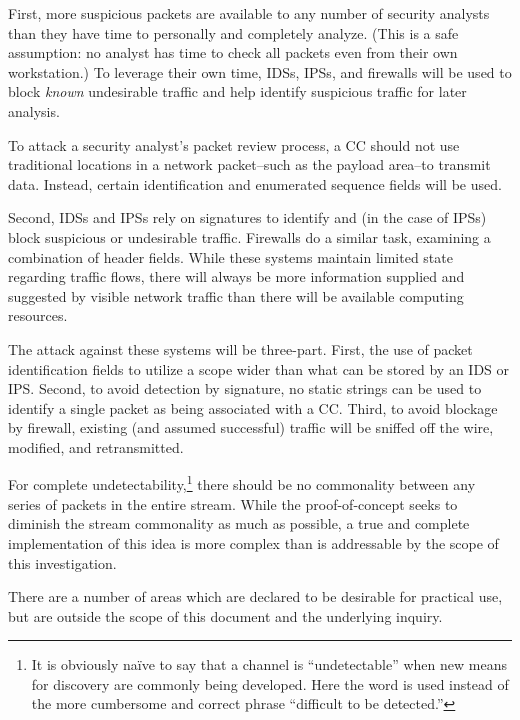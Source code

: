 \documentclass[letterpaper,10pt,draft]{article}
\begin{document}
First, more suspicious packets are available to any number of security
analysts than they have time to personally and completely analyze.
(This is a safe assumption: no analyst has time to check all packets
even from their own workstation.)  To leverage their own time, IDSs,
IPSs, and firewalls will be used to block \textit{known} undesirable
traffic and help identify suspicious traffic for later analysis.

To attack a security analyst's packet review process, a CC should not
use traditional locations in a network packet--such as the payload
area--to transmit data.  Instead, certain identification and
enumerated sequence fields will be used.

Second, IDSs and IPSs rely on signatures to identify and (in the case of
IPSs) block suspicious or undesirable traffic.  Firewalls do a similar
task, examining a combination of header fields.  While these systems
maintain limited state regarding traffic flows, there will always be
more information supplied and suggested by visible network traffic
than there will be available computing resources.

The attack against these systems will be three-part. First, the
use of packet identification fields to utilize a scope
wider than what can be stored by an IDS or IPS.  Second, to avoid
detection by signature, no static strings can be used to identify a
single packet as being associated with a CC.  Third, to avoid blockage
by firewall, existing (and assumed successful) traffic will be sniffed
off the wire, modified, and retransmitted.  

For complete undetectability,\footnote{It is obviously na\"ive to say
that a channel is ``undetectable'' when new means for discovery are
commonly being developed.  Here the word is used instead of the more
cumbersome and correct phrase ``difficult to be detected.''} there
should be no commonality between any series of packets in the entire
stream.  While the proof-of-concept seeks to diminish the stream
commonality as much as possible, a true and complete implementation of
this idea is more complex than is addressable by the scope of this
investigation.

There are a number of areas which are declared to be desirable for
practical use, but are outside the scope of this document and the
underlying inquiry.
\end{document}
